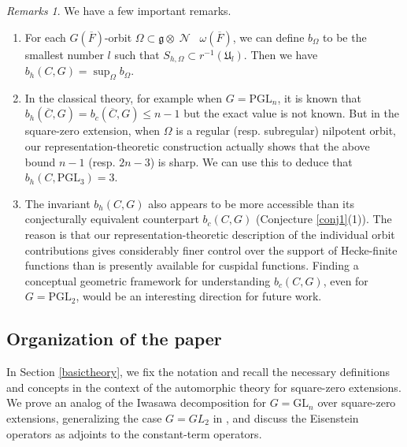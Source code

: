 \documentclass[11pt]{amsart}
\theoremstyle{definition}
\theoremstyle{remark}
\newtheorem{rems}[thm]{Remarks}
\DeclareMathOperator{\N}{\mathcal{N}}
\DeclareMathOperator{\inv}{^{-1}}
\newcommand{\bF}{\overline{F}}
\newcommand{\PGL}{\mathrm{PGL}}
\newcommand{\GL}{\mathrm{GL}}
\numberwithin{equation}{section}
\begin{document}
\begin{rems} We have a few important remarks.

\begin{enumerate}
  \item For each $G(\bF)$-orbit $\Omega \subset \mathfrak{g} \otimes \N \inv \omega (\bF)$, we can define $b_\Omega$ to be the smallest number $l$ such that $S_{h,\Omega} \subset r^{-1}(\mathfrak{U}_l)$. Then we have $b_h(C,G)= \sup_\Omega b_\Omega $.
    

    \item In the classical theory, for example when $G=\PGL_n$, it is known that  $b_h(\overline{C},G)=b_c(\overline{C},G)\leq n-1$ but the exact value is not known. But in the square-zero extension, when $\Omega$ is a regular (resp. subregular) nilpotent orbit, our representation-theoretic construction actually shows that the above bound $n-1$ (resp. $2n-3$) is sharp. We can use this to deduce that $b_h(C, \PGL_3)=3$.

    \item The invariant $b_h(C,G)$ also appears to be more accessible than its conjecturally equivalent counterpart $b_c(C,G)$ (Conjecture \ref{conj1}(1)). The reason is that our representation-theoretic description of the individual orbit contributions gives considerably finer control over the support of Hecke-finite functions than is presently available for cuspidal functions. Finding a conceptual geometric framework for understanding $b_c(C,G)$, even for $G=\PGL_2$, would be an interesting direction for future work.
  
\end{enumerate}


\end{rems}







\subsection{Organization of the paper}
In Section \ref{basictheory}, we fix the notation and recall the necessary definitions and concepts in the context of the automorphic theory for square-zero extensions. We prove an analog of the Iwasawa decomposition for $G=\GL_n$ over square-zero extensions, generalizing the case $G=GL_2$ in \cite{BKP}, and discuss the Eisenstein operators as adjoints to the constant-term operators. 
\end{document}
